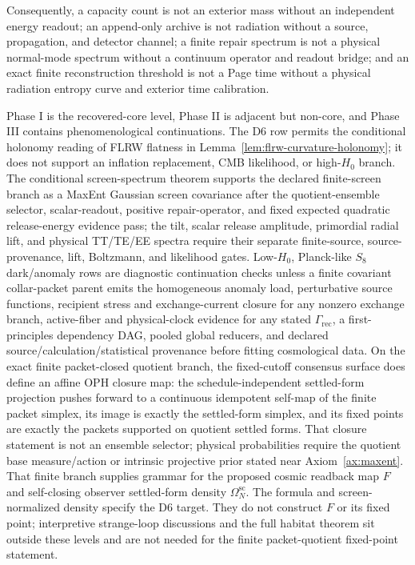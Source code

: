 \documentclass[11pt]{article}
\begin{document}
Consequently, a capacity count is not an exterior mass without an independent
energy readout; an append-only archive is not radiation without a source,
propagation, and detector channel; a finite repair spectrum is not a physical
normal-mode spectrum without a continuum operator and readout bridge; and an
exact finite reconstruction threshold is not a Page time without a physical
radiation entropy curve and exterior time calibration.

Phase I is the recovered-core level, Phase II is adjacent but non-core, and Phase III contains phenomenological continuations. The D6 row permits the conditional holonomy reading of FLRW flatness in Lemma~\ref{lem:flrw-curvature-holonomy}; it does not support an inflation replacement, CMB likelihood, or high-\(H_0\) branch. The conditional screen-spectrum theorem supports the declared finite-screen branch as a MaxEnt Gaussian screen covariance after the quotient-ensemble selector, scalar-readout, positive repair-operator, and fixed expected quadratic release-energy evidence pass; the tilt, scalar release amplitude, primordial radial lift, and physical TT/TE/EE spectra require their separate finite-source, source-provenance, lift, Boltzmann, and likelihood gates. Low-\(H_0\), Planck-like \(S_8\) dark/anomaly rows are diagnostic continuation checks unless a finite covariant collar-packet parent emits the homogeneous anomaly load, perturbative source functions, recipient stress and exchange-current closure for any nonzero exchange branch, active-fiber and physical-clock evidence for any stated \(\Gamma_{\mathrm{rec}}\), a first-principles dependency DAG, pooled global reducers, and declared source/calculation/statistical provenance before fitting cosmological data. On the exact finite packet-closed quotient branch, the fixed-cutoff consensus surface does define an affine OPH closure map: the schedule-independent settled-form projection pushes forward to a continuous idempotent self-map of the finite packet simplex, its image is exactly the settled-form simplex, and its fixed points are exactly the packets supported on quotient settled forms. That closure statement is not an ensemble selector; physical probabilities require the quotient base measure/action or intrinsic projective prior stated near Axiom~\ref{ax:maxent}. That finite branch supplies grammar for the proposed cosmic readback map \(F\) and self-closing observer settled-form density \(\Omega^{\mathrm{sc}}_N\). The formula and screen-normalized density specify the D6 target. They do not construct \(F\) or its fixed point; interpretive strange-loop discussions and the full habitat theorem sit outside these levels and are not needed for the finite packet-quotient fixed-point statement.
\end{document}
